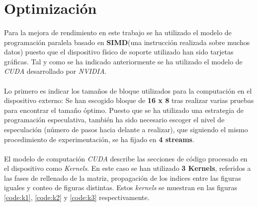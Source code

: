 \documentclass[10pt, a4paper,spanish]{article}
\begin{document}
		\paragraph{}
		\cite{subject:cp}

	\section{Optimización}

		\paragraph{}
		Para la mejora de rendimiento en este trabajo se ha utilizado el modelo de programación paralela basado en \textbf{SIMD}(una instrucción realizada sobre muchos datos) puesto que el dispositivo físico de soporte utilizado han sido tarjetas gráficas. Tal y como se ha indicado anteriormente se ha utilizado el modelo de \emph{CUDA} desarrollado por \emph{NVIDIA}.

		\paragraph{}
		Lo primero es indicar los tamaños de bloque utilizados para la computación en el dispositivo externo: Se han escogido bloque de \textbf{16 x 8} tras realizar varias pruebas para encontrar el tamaño óptimo. Puesto que se ha utilizado una estrategia de programación especulativa, también ha sido necesario escoger el nivel de especulación (número de pasos hacia delante a realizar), que siguiendo el mismo procedimiento de experimentación, se ha fijado en \textbf{4 streams}.

		\paragraph{}
		El modelo de computación \emph{CUDA} describe las secciones de código procesado en el dispositivo como \emph{Kernels}. En este caso se han utilizado \textbf{3 Kernels}, referidos a las fases de rellenado de la matriz, propagación de los indices entre las figuras iguales y conteo de figuras distintas. Estos \emph{kernels} se muestran en las figuras \ref{code:k1}, \ref{code:k2} y \ref{code:k3} respectivamente.
\end{document}
